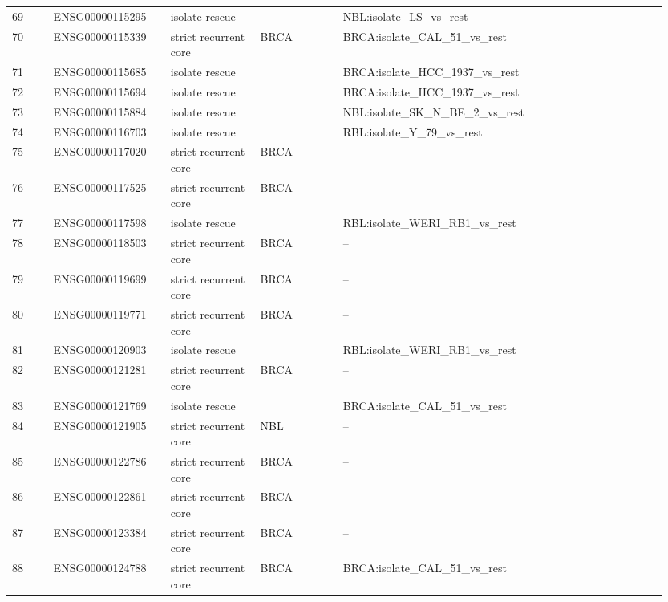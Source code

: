 \begin{landscape}
{\begin{longtable}{p{0.06\linewidth}p{0.17\linewidth}p{0.13\linewidth}p{0.12\linewidth}p{0.47\linewidth}}
69 & ENSG00000115295 & isolate rescue &  & NBL:isolate\_\allowbreak{}LS\_\allowbreak{}vs\_\allowbreak{}rest \\
70 & ENSG00000115339 & strict recurrent core & BRCA & BRCA:isolate\_\allowbreak{}CAL\_\allowbreak{}51\_\allowbreak{}vs\_\allowbreak{}rest \\
71 & ENSG00000115685 & isolate rescue &  & BRCA:isolate\_\allowbreak{}HCC\_\allowbreak{}1937\_\allowbreak{}vs\_\allowbreak{}rest \\
72 & ENSG00000115694 & isolate rescue &  & BRCA:isolate\_\allowbreak{}HCC\_\allowbreak{}1937\_\allowbreak{}vs\_\allowbreak{}rest \\
73 & ENSG00000115884 & isolate rescue &  & NBL:isolate\_\allowbreak{}SK\_\allowbreak{}N\_\allowbreak{}BE\_\allowbreak{}2\_\allowbreak{}vs\_\allowbreak{}rest \\
74 & ENSG00000116703 & isolate rescue &  & RBL:isolate\_\allowbreak{}Y\_\allowbreak{}79\_\allowbreak{}vs\_\allowbreak{}rest \\
75 & ENSG00000117020 & strict recurrent core & BRCA & -- \\
76 & ENSG00000117525 & strict recurrent core & BRCA & -- \\
77 & ENSG00000117598 & isolate rescue &  & RBL:isolate\_\allowbreak{}WERI\_\allowbreak{}RB1\_\allowbreak{}vs\_\allowbreak{}rest \\
78 & ENSG00000118503 & strict recurrent core & BRCA & -- \\
79 & ENSG00000119699 & strict recurrent core & BRCA & -- \\
80 & ENSG00000119771 & strict recurrent core & BRCA & -- \\
81 & ENSG00000120903 & isolate rescue &  & RBL:isolate\_\allowbreak{}WERI\_\allowbreak{}RB1\_\allowbreak{}vs\_\allowbreak{}rest \\
82 & ENSG00000121281 & strict recurrent core & BRCA & -- \\
83 & ENSG00000121769 & isolate rescue &  & BRCA:isolate\_\allowbreak{}CAL\_\allowbreak{}51\_\allowbreak{}vs\_\allowbreak{}rest \\
84 & ENSG00000121905 & strict recurrent core & NBL & -- \\
85 & ENSG00000122786 & strict recurrent core & BRCA & -- \\
86 & ENSG00000122861 & strict recurrent core & BRCA & -- \\
87 & ENSG00000123384 & strict recurrent core & BRCA & -- \\
88 & ENSG00000124788 & strict recurrent core & BRCA & BRCA:isolate\_\allowbreak{}CAL\_\allowbreak{}51\_\allowbreak{}vs\_\allowbreak{}rest \\

\end{longtable}}
\end{landscape}

